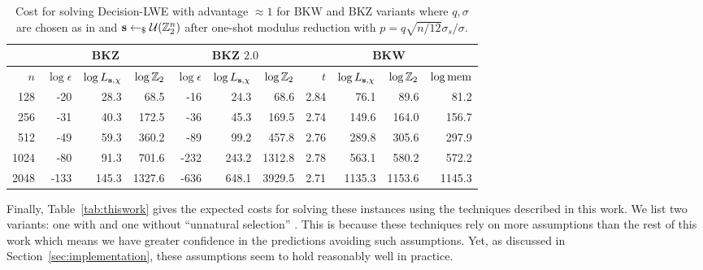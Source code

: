 {\begin{table}
\centering{}
\begin{tabular}{|r||r|r|r||r|r|r||r|r|r|r|}
\hline
    & \multicolumn{3}{|c||}{BKZ \cite{LindnerP10}} & \multicolumn{3}{|c||}{BKZ $2.0$ \cite{liu-nguyen:ctrsa2013}} & \multicolumn{4}{|c|}{BKW \cite{albrecht-cid-faugere-fitzpatrick-perret:dcc2013}}\\
\hline
$n$ & $\log \epsilon$ & $\log L_{\mathbf{s},\chi}$ & $\log \mathbb{Z}_2$ & $\log \epsilon$ & $\log L_{\mathbf{s},\chi}$ & $\log \mathbb{Z}_2$ & $t$ &  $\log L_{\mathbf{s},\chi}$ & $\log \mathbb{Z}_2$ & $\log \textnormal{mem}$\\
\hline
 128 &    -20 &     28.3 &     68.5 &    -16 &     24.3 &     68.6 &  2.84 &     76.1 &     89.6 &     81.2 \\
 256 &    -31 &     40.3 &    172.5 &    -36 &     45.3 &    169.5 &  2.74 &    149.6 &    164.0 &    156.7 \\
 512 &    -49 &     59.3 &    360.2 &    -89 &     99.2 &    457.8 &  2.76 &    289.8 &    305.6 &    297.9 \\
1024 &    -80 &     91.3 &    701.6 &   -232 &    243.2 &   1312.8 &  2.78 &    563.1 &    580.2 &    572.2 \\
2048 &   -133 &    145.3 &   1327.6 &   -636 &    648.1 &   3929.5 &  2.71 &   1135.3 &   1153.6 &   1145.3 \\
\hline
\end{tabular}
\caption{Cost for solving Decision-LWE with advantage $\approx 1$ for BKW and BKZ variants where $q,\sigma$ are chosen as in \cite{regev:acm09} and $\mathbf{s} \leftarrow_{\$} \mathcal{U}(\mathbb{Z}_2^n)$ after one-shot modulus reduction with $p = q\sqrt{n/12}\sigma_s/\sigma$.}
\label{tab:modred}
\end{table}

Finally, Table~\ref{tab:thiswork} gives the expected costs for solving these \LWE{} instances using the techniques described in this work. We list two variants: one with and one without ``unnatural selection'' . This is because these techniques rely on more assumptions than the rest of this work which means we have greater confidence in the predictions avoiding such assumptions. Yet, as discussed in Section~\ref{sec:implementation}, these assumptions seem to hold reasonably well in practice.

}
